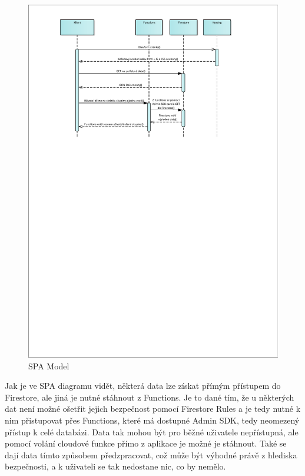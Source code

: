 \begin{figure}[H]
    \includegraphics[width=\textwidth]{pdf/SPA-model}
    \caption{SPA Model} \label{picture:recipeo:spa-model}
\end{figure}

Jak je ve SPA diagramu vidět, některá data lze získat přímým přístupem do Firestore, ale jiná je nutné stáhnout z Functions.
Je to dané tím, že u některých dat není možné ošetřit jejich bezpečnost pomocí Firestore Rules a je tedy nutné k nim přistupovat
přes Functions, které má dostupné Admin SDK, tedy neomezený přístup k celé databázi. Data tak mohou být pro běžné uživatele nepřístupná,
ale pomocí volání cloudové funkce přímo z aplikace je možné je stáhnout. Také se dají data tímto způsobem předzpracovat, což může
být výhodné právě z hlediska bezpečnosti, a k uživateli se tak nedostane nic, co by nemělo.


